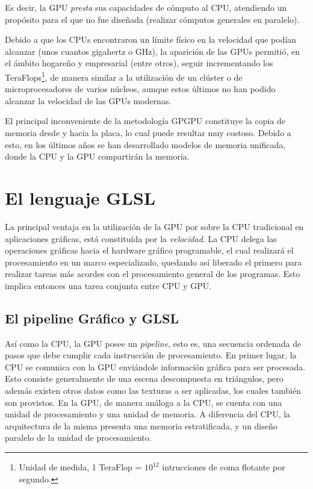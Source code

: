 Es decir, la GPU {\em presta} sus capacidades de cómputo al CPU, atendiendo un propósito para el que no fue diseñada (realizar cómputos generales en paralelo).

Debido a que los CPUs encontraron un límite físico en la velocidad que podían alcanzar (unos cuantos gigahertz o GHz), la aparición de las GPUs permitió, en el ámbito hogareño y empresarial (entre otros), seguir incrementando los TeraFlops\footnote{Unidad de medida, 1 TeraFlop = $10^{12}$ intrucciones de coma flotante por segundo.}, de manera similar a la utilización de un clúster o de microprocesadores de varios núcleos, aunque estos últimos no han podido alcanzar la velocidad de las GPUs modernas.

El principal inconveniente de la metodología GPGPU constituye la copia de memoria desde y hacia la placa, lo cual puede resultar muy costoso.
Debido a esto, en los últimos años se han desarrollado modelos de memoria unificada, donde la CPU y la GPU compartirán la memoria.



\section{El lenguaje GLSL}
La principal ventaja en la utilización de la GPU por sobre la CPU tradicional en aplicaciones gráficas, está constituída por la {\em velocidad}.
La CPU delega las operaciones gr\'aficas hacia el hardware gr\'afico programable, el cual realizar\'a el procesamiento en un marco especializado, quedando as\'i liberado el primero para realizar tareas m\'as acordes con el procesamiento general de los programas.
Esto implica entonces una tarea conjunta entre CPU y GPU.


\subsection{El pipeline Gr\'afico y GLSL}
As\'i como la CPU, la GPU posee un {\em pipeline}, esto es, una secuencia ordenada de pasos que debe cumplir cada instrucci\'on de procesamiento.
En primer lugar, la CPU se comunica con la GPU enviándole información gráfica para ser procesada.
Esto consiste generalmente de una escena descompuesta en triángulos, pero además existen otros datos como las texturas a ser aplicadas, los cuales también son provistos.
En la GPU, de manera análoga a la CPU, se cuenta con una unidad de procesamiento y una unidad de memoria.
A diferencia del CPU, la arquitectura de la misma presenta una memoria estratificada, y un diseño paralelo de la unidad de procesamiento.

